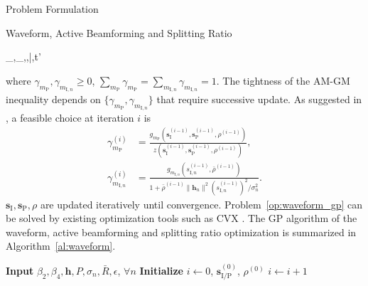 \documentclass[journal]{IEEEtran}
\begin{document}
\begin{section}{Problem Formulation}
\begin{subsection}{Waveform, Active Beamforming and Splitting Ratio}
			\begin{mini!}
				{_{},_,\rho,\bar{\rho},t'}{}{\label{op:waveform_gp}}{}
			\end{mini!}
			where $\gamma_{m_\mathrm{P}},\gamma_{m_{\mathrm{I},n}} \ge 0$, $\sum_{m_\mathrm{P}}\gamma_{m_\mathrm{P}}=\sum_{m_{\mathrm{I},n}}\gamma_{m_{\mathrm{I},n}}=1$. The tightness of the AM-GM inequality depends on $\{\gamma_{m_\mathrm{P}},\gamma_{m_{\mathrm{I},n}}\}$ that require successive update. As suggested in \cite{Clerckx2018b}, a feasible choice at iteration $i$ is
			\begin{align}
				\gamma_{m_\mathrm{P}}^{(i)} & = \frac{g_{m_\mathrm{P}}(\boldsymbol{s}_{\mathrm{I}}^{(i-1)},\boldsymbol{s}_\mathrm{P}^{(i-1)},\rho^{(i-1)})}{z(\boldsymbol{s}_{\mathrm{I}}^{(i-1)},\boldsymbol{s}_\mathrm{P}^{(i-1)},\rho^{(i-1)})}\label{eq:gamma_P},\\
				\gamma_{m_{\mathrm{I},n}}^{(i)} & = \frac{g_{m_{\mathrm{I},n}}(s_{\mathrm{I},n}^{(i-1)},\bar{\rho}^{(i-1)})}{1+{\bar{\rho}^{(i-1)}\lVert{\boldsymbol{h}_n}\rVert^2 (s_{\mathrm{I},n}^{(i-1)})^2}\big/{\sigma_n^2}}.\label{eq:gamma_I}
			\end{align}
			$\boldsymbol{s}_{\mathrm{I}},\boldsymbol{s}_\mathrm{P},\rho$ are updated iteratively until convergence. Problem~\eqref{op:waveform_gp} can be solved by existing optimization tools such as CVX \cite{Grant2013}. The GP algorithm of the waveform, active beamforming and splitting ratio optimization is summarized in Algorithm~\ref{al:waveform}.
			\begin{algorithm}[!t]
				\caption{GP: Waveform, Active Beamforming and Splitting Ratio.}
				\label{al:waveform}
				\begin{algorithmic}[1]
					\State \textbf{Input} $\beta_2,\beta_4,\boldsymbol{h},P,\sigma_n,\bar{R},\epsilon$, $\forall n$
					\State \textbf{Initialize} $i \gets 0$, $\boldsymbol{s}_{\mathrm{I/P}}^{(0)}$, $\rho^{(0)}$
					\Repeat
						\State $i \gets i + 1$

\end{algorithmic}
\end{algorithm}
\end{subsection}
\end{section}
\end{document}
